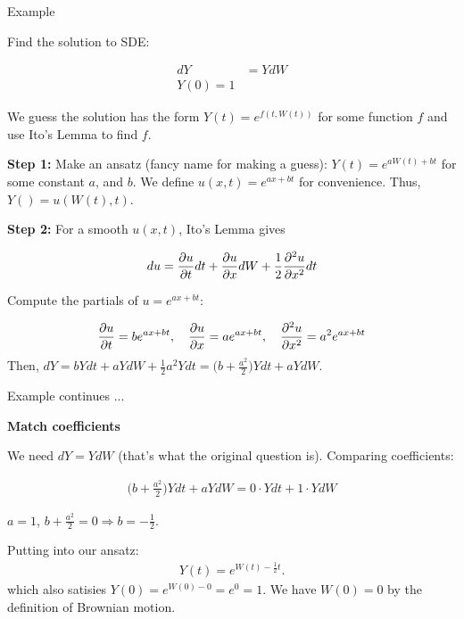 \documentclass[aspectratio=169,xcolor=dvipsnames,svgnames,x11names,fleqn]{beamer}
\begin{document}
\begin{frame}{Example}

    \scriptsize 

    Find the solution to SDE:

    \begin{align*}
        dY & = YdW \\
        Y(0) = 1
    \end{align*}

    We guess the solution has the form $Y(t) = e^{f(t, W(t))}$ for some function $f$ and use Ito's Lemma to find $f$.

    \vspace{5pt}

    \pause 

    \textbf{Step 1:} Make an ansatz (fancy name for making a guess): $Y(t) = e^{aW(t) + bt}$ for some constant $a$, and $b$. We define $u(x, t) = e^{ax + bt}$ for convenience. Thus, $Y() = u(W(t), t)$.

    \vspace{5pt}

    \pause 

    \textbf{Step 2:} For a smooth $u(x, t)$, Ito's Lemma gives 

    \begin{align*}
        du  = \pdv{u}{t}dt + \pdv{u}{x}dW+ \frac{1}{2}\pdv[2]{u}{x} dt
    \end{align*}

    Compute the partials of $u = e^{ax + bt}$: 

    \begin{align*}
        \pdv{u}{t} = be^{ax + bt}, \quad \pdv{u}{x} = a e^{ax + bt}, \quad \pdv[2]{u}{x} = a^2 e^{ax + bt}
    \end{align*}
    Then,  $dY = bYdt + a YdW + \frac{1}{2}a^2 Y dt = \bigg( b + \frac{a^2}{2} \bigg) Y dt + aY dW$.

    
\end{frame}

\begin{frame}{Example continues ...}

    \textbf{Match coefficients}

    We need $dY = Y dW$ (that's what the original question is). Comparing coefficients:

    \begin{align*}
        \bigg( b + \frac{a^2}{2} \bigg) Y dt + aY dW =  0\cdot Y dt + 1\cdot Y dW
    \end{align*}
    
    $ a= 1$, $ b + \frac{a^2}{2} = 0 \Rightarrow b  = -\frac{1}{2}$.
    
    \vspace{5pt}

    \pause 

    Putting into our ansatz:
    \begin{align*}
        Y(t) = e^{W(t) - \frac{1}{2}t}. 
    \end{align*}
    which also satisies $Y(0) = e^{W(0) - 0} = e^0 = 1$. We have $W(0) = 0$ by the definition of Brownian motion.
\end{frame}
\end{document}
